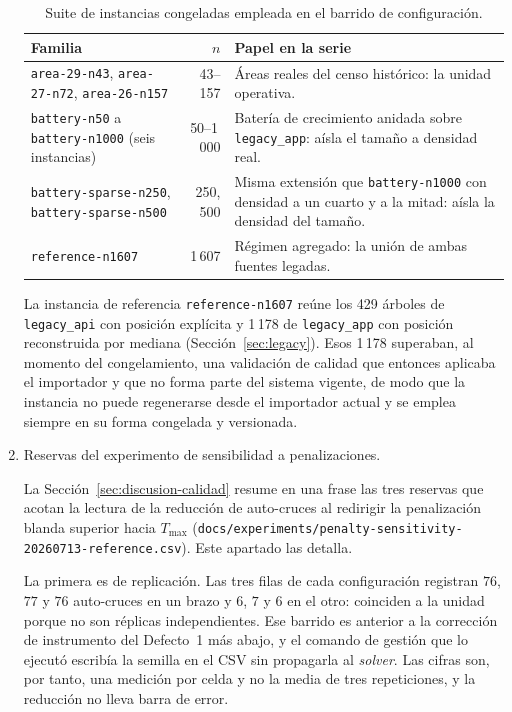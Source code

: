 \begin{enumerate}
\begin{table}[H]
  \centering
  \caption{Suite de instancias congeladas empleada en el barrido de configuración.}
  \label{tab:suite-instancias}
  \small
  \begin{tabularx}{\textwidth}{@{}l r X@{}}
    \toprule
    Familia & $n$ & Papel en la serie \\
    \midrule
    \texttt{area-29-n43}, \texttt{area-27-n72}, \texttt{area-26-n157} &
      43--157 &
      Áreas reales del censo histórico: la unidad operativa. \\
    \texttt{battery-n50} a \texttt{battery-n1000} (seis instancias) &
      50--1\,000 &
      Batería de crecimiento anidada sobre \texttt{legacy\_app}: aísla el tamaño a
      densidad real. \\
    \texttt{battery-sparse-n250}, \texttt{battery-sparse-n500} &
      250, 500 &
      Misma extensión que \texttt{battery-n1000} con densidad a un cuarto y a la mitad:
      aísla la densidad del tamaño. \\
    \texttt{reference-n1607} &
      1\,607 &
      Régimen agregado: la unión de ambas fuentes legadas. \\
    \bottomrule
  \end{tabularx}
\end{table}

La instancia de referencia \texttt{reference-n1607} reúne los 429 árboles de \texttt{legacy\_api}
con posición explícita y 1\,178 de \texttt{legacy\_app} con posición reconstruida por mediana
(Sección~\ref{sec:legacy}). Esos 1\,178 superaban, al momento del congelamiento, una validación de
calidad que entonces aplicaba el importador y que no forma parte del sistema vigente, de modo que
la instancia no puede regenerarse desde el importador actual y se emplea siempre en su forma
congelada y versionada.

\item Reservas del experimento de sensibilidad a penalizaciones.
\label{anx:reservas-sensibilidad}

La Sección~\ref{sec:discusion-calidad} resume en una frase las tres reservas que acotan la lectura
de la reducción de auto-cruces al redirigir la penalización blanda superior hacia $T_{\max}$
(\texttt{docs/experiments/penalty-sensitivity-20260713-reference.csv}). Este apartado las detalla.

La primera es de replicación. Las tres filas de cada configuración registran $76$, $77$ y $76$
auto-cruces en un brazo y $6$, $7$ y $6$ en el otro: coinciden a la unidad porque no son réplicas
independientes. Ese barrido es anterior a la corrección de instrumento del Defecto~1 más abajo, y el
comando de gestión que lo ejecutó escribía la semilla en el CSV sin propagarla al \textit{solver}.
Las cifras son, por tanto, una medición por celda y no la media de tres repeticiones, y la reducción
no lleva barra de error.


\end{enumerate}
